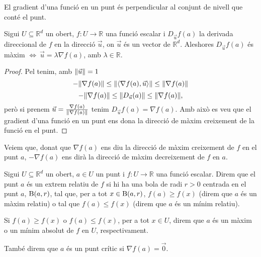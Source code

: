 \documentclass[../Apunts.tex]{subfiles}
\begin{document}
	\begin{observation}\label{obs:gradient ortogonal}
		El gradient d'una funció en un punt és perpendicular al conjunt de nivell que conté el punt.%
	\end{observation}
	\begin{proposition}
		Sigui \(U\subseteq\mathbb{R}^{d}\) un obert, \(f\colon U\to\mathbb{R}\) una funció escalar i \(D_{\vec{u}}f(a)\) la derivada direccional de \(f\) en la direcció \(\vec{u}\), on \(\vec{u}\) és un vector de \(\mathbb{R}^{d}\). Aleshores \(D_{\vec{u}}f(a)\) és màxim \(\Longleftrightarrow\ \vec{u}=\lambda\nabla f(a)\), amb \(\lambda\in\mathbb{R}\).
		\begin{proof}
			Pel  tenim, amb \(\norm{\vec{u}}=1\)
			\[-\norm{\nabla f(a)}\leq\norm{\langle\nabla f(a),\vec{u}\rangle}\leq\norm{\nabla f(a)}\]
			\[-\norm{\nabla f(a)}\leq\norm{D_{\vec{u}}(a)}\leq\norm{\nabla f(a)},\]
			però si prenem \(\vec{u}=\frac{\nabla f(a)}{\norm{\nabla f(a)}}\) tenim \(D_{\vec{u}}f(a)=\nabla f(a)\). Amb això es veu que el gradient d'una funció en un punt ens dona la direcció de màxim creixement de la funció en el punt.
		\end{proof}
	\end{proposition}
	\begin{observation}
		Veiem que, donat que \(\nabla f(a)\) ens diu la direcció de màxim creixement de \(f\) en el punt \(a\), \(-\nabla f(a)\) ens dirà la direcció de màxim decreixement de \(f\) en \(a\).
	\end{observation}
	\begin{definition}
		\label{def:extrems relatius}
		\label{punts crítics}
		Sigui \(U\subseteq\mathbb{R}^{d}\) un obert, \(a\in U\) un punt i \(f\colon U\to\mathbb{R}\) una funció escalar. Direm que el punt \(a\) és un extrem relatiu de \(f\) si hi ha una bola de radi \(r>0\) centrada en el punt \(a\), \(\operatorname{B}(a,r)\), tal que, per a tot \(x\in\operatorname{B}(a,r)\), \(f(a)\geq f(x)\) (direm que \(a\) és un màxim relatiu) o tal que \(f(a)\leq f(x)\) (direm que \(a\) és un mínim relatiu).
		
		Si \(f(a)\geq f(x)\) o \(f(a)\leq f(x)\), per a tot \(x\in U\), direm que \(a\) és un màxim o un mínim absolut de \(f\) en \(U\), respectivament.
		
		També direm que \(a\) és un punt crític si \(\nabla f(a)=\vec{0}\).
	\end{definition}
\end{document}
